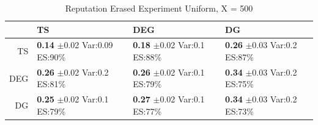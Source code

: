\documentclass[11pt,letterpaper]{article}
\begin{document}
\begin{table}[ht]
\centering
\caption{Reputation Erased Experiment Uniform, X = 500} 
\begin{tabular}{rlll}
  \hline
 & TS & DEG &  DG \\ 
  \hline
TS & \makecell{\textbf{0.14} $\pm$0.02\\Var:0.09\\ES:90\%} & \makecell{\textbf{0.18} $\pm$0.02\\Var:0.1\\ES:88\%} & \makecell{\textbf{0.26} $\pm$0.03\\Var:0.2\\ES:87\%} \\ 
  DEG & \makecell{\textbf{0.26} $\pm$0.02\\Var:0.2\\ES:81\%} & \makecell{\textbf{0.26} $\pm$0.02\\Var:0.1\\ES:79\%} & \makecell{\textbf{0.34} $\pm$0.03\\Var:0.2\\ES:75\%} \\ 
   DG & \makecell{\textbf{0.25} $\pm$0.02\\Var:0.1\\ES:79\%} & \makecell{\textbf{0.27} $\pm$0.02\\Var:0.1\\ES:77\%} & \makecell{\textbf{0.34} $\pm$0.03\\Var:0.2\\ES:73\%} \\ 
   \hline
\end{tabular}
\end{table}
\end{document}
